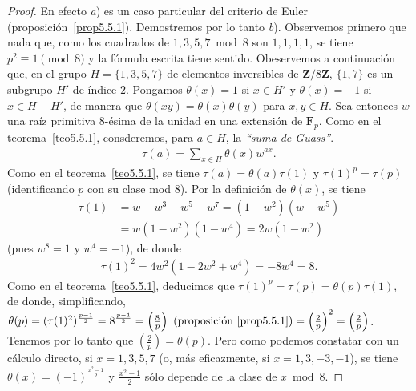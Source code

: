 \documentclass[10pt,oneside,bibtotoc,smallheadings,leqno,a5paper,DIV=12]{scrbook}
\newcommand{\ZZ}{\mathbf{Z}}
\newcommand{\FF}{\mathbf{F}}
\newcommand{\QED}{}%
\newcommand{\leg}[2]{\left(\frac{#1}{#2}\right)}
\numberwithin{equation}{section}
\theoremstyle{defi}
\theoremstyle{enonce}
\theoremstyle{rem}
\numberwithin{theorem}{section}
\numberwithin{proposition}{section}
\numberwithin{definition}{section}
\numberwithin{lemma}{section}
\numberwithin{corollary}{section}
\numberwithin{example}{section}
\numberwithin{footnote}{section}%
\begin{document}
\begin{proof}
En efecto {\itshape a}) es un caso particular del criterio de Euler (proposici\'on~\ref{prop5.5.1}).
Demostremos por lo tanto
{\itshape b}). Observemos primero que nada que, como los cuadrados de $1, 3, 5, 7\bmod 8$ son $1,1,1,1$,
se tiene $p^{2}\equiv 1\pmod 8$ y la f\'ormula escrita tiene sentido. Obeservemos a continuaci\'on
que, en el grupo $H = \{1,3,5,7\}$ de elementos inversibles de $\ZZ/8\ZZ$, $\{1,7\}$ es un subgrupo
$H'$ de \'indice $2$. Pongamos $\theta(x) = 1$ si $x\in H'$ y $\theta(x) = -1$ si $x\in H-H'$, de manera
que $\theta(xy) = \theta(x)\theta(y)$ para $x,y\in H$. Sea entonces $w$ una ra\'iz primitiva $8$-\'esima
de la unidad en una extensi\'on de $\FF_{p}$. Como en el teorema~\ref{teo5.5.1},
consderemos, para $a\in H$, la {\em ``suma de Guass''}.
\begin{gather}
\tau(a) = \sum_{x\in H}\theta(x)w^{ax}.
\end{gather}
Como en el teorema~\ref{teo5.5.1}, se tiene $\tau(a) = \theta(a)\tau(1)$ y $\tau(1)^{p}=\tau(p)$ (identificando
$p$ con su clase mod $8$). Por la definici\'on de $\theta(x)$, se tiene
\begin{align*}
\tau(1) &= w-w^{3}-w^{5}+w^{7}=(1-w^{2})(w-w^{5})\\
&= w(1-w^{2})(1-w^{4})=2w(1-w^{2})
\end{align*}
(pues $w^{8}=1$ y $w^{4}=-1$), de donde
\begin{gather*}
\tau(1)^{2}=4w^{2}(1-2w^{2}+w^{4})=-8w^{4}=8.
\end{gather*}
Como en el teorema~\ref{teo5.5.1}, deducimos que $\tau(1)^{p}=\tau(p) = \theta(p)\tau(1)$, de donde, simplificando,
$\theta(p) = (\tau(1)^{2})^{\frac{p-1}{2}}=8^{\frac{p-1}{2}}=\leg{8}{p}
\text{ (proposici\'on~\ref{prop5.5.1})}=
\leg{2}{p}^{2}=\leg{2}{p}$. Tenemos por lo tanto que $\leg{2}{p} = \theta(p)$. Pero como podemos
constatar con un c\'alculo directo, si $x=1,3,5,7$ (o, m\'as eficazmente, si $x = 1,3,-3,-1$), se
tiene $\theta(x) = (-1)^{\frac{x^{2}-1}{2}}$ y $\frac{x^{2}-1}{2}$ s\'olo depende de la clase de $x\bmod 8$. \QED
\end{proof}
\end{document}
